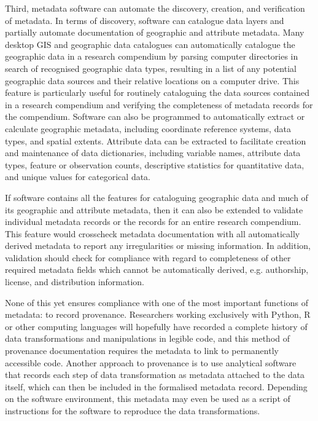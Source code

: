 \documentclass{isprs} %
\begin{document}
Third, metadata software can automate the discovery, creation, and verification of metadata.
In terms of discovery, software can catalogue data layers and partially automate documentation of geographic and attribute metadata.
Many desktop GIS and geographic data catalogues can automatically catalogue the geographic data in a research compendium by parsing computer directories in search of recognised geographic data types, resulting in a list of any potential geographic data sources and their relative locations on a computer drive.
This feature is particularly useful for routinely cataloguing the data sources contained in a research compendium and verifying the completeness of metadata records for the compendium.
Software can also be programmed to automatically extract or calculate geographic metadata, including coordinate reference systems, data types, and spatial extents.
Attribute data can be extracted to facilitate creation and maintenance of data dictionaries, including variable names, attribute data types, feature or observation counts, descriptive statistics for quantitative data, and unique values for categorical data.

If software contains all the features for cataloguing geographic data and much of its geographic and attribute metadata, then it can also be extended to validate individual metadata records or the records for an entire research compendium.
This feature would crosscheck metadata documentation with all automatically derived metadata to report any irregularities or missing information.
In addition, validation should check for compliance with regard to completeness of other required metadata fields which cannot be automatically derived, e.g. authorship, license, and distribution information.

None of this yet ensures compliance with one of the most important functions of metadata: to record provenance.
Researchers working exclusively with Python, R or other computing languages will hopefully have recorded a complete history of data transformations and manipulations in legible code, and this method of provenance documentation requires the metadata to link to permanently accessible code.
Another approach to provenance is to use analytical software that records each step of data transformation as metadata attached to the data itself, which can then be included in the formalised metadata record.
Depending on the software environment, this metadata may even be used as a script of instructions for the software to reproduce the data transformations.
\end{document}
